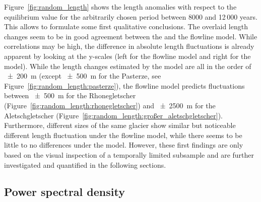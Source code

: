     Figure~\ref{fig:random_length} shows the length anomalies with respect to the equilibrium value for the arbitrarily chosen period between 8000 and 12\,000 years. This allows to formulate some first qualitative conclusions. The overlaid length changes seem to be in good agreement between the \vas{} and the flowline model. While correlations may be high, the difference in absolute length fluctuations is already apparent by looking at the y-scales (left for the flowline model and right for the \vas{} model). While the length changes estimated by the \vas{} model are all in the order of \SI{\pm200}{\meter} (except \SI{\pm500}{\meter} for the Pasterze, see Figure~\ref{fig:random_length:pasterze}), the flowline model predicts fluctuations between \SI{\pm500}{\meter} for the Rhonegletscher (Figure~\ref{fig:random_length:rhonegletscher}) and \SI{\pm2500}{\meter} for the Aletschgletscher (Figure~\ref{fig:random_length:großer_aletschgletscher}). Furthermore, different sizes of the same glacier show similar but noticeable different length fluctuation under the flowline model, while there seems to be little to no differences under the \vas{} model. However, these first findings are only based on the visual inspection of a temporally limited subsample and are further investigated and quantified in the following sections.

    \subsection{Power spectral density} %
    \label{sub:power_spectral_density_results}

